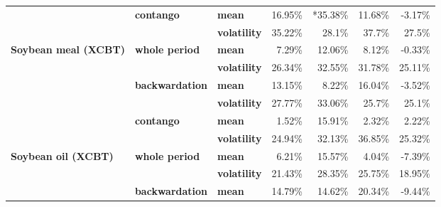 \documentclass[
  authoryear,
  preprint,
  3p]{elsarticle}
\begin{document}
\begin{longtable}[t]{>{}l>{}l>{}l>{}r>{}r>{}r>{}r}
\addlinespace
\textbf{} & \textbf{contango} & \textbf{mean} & \textcolor[HTML]{4285f4}{16.95\%} & \textcolor[HTML]{4285f4}{*35.38\%} & \textcolor[HTML]{4285f4}{11.68\%} & \textcolor[HTML]{4285f4}{-3.17\%}\\
\textbf{} & \textbf{} & \textbf{volatility} & \textcolor[HTML]{4285f4}{35.22\%} & \textcolor[HTML]{4285f4}{28.1\%} & \textcolor[HTML]{4285f4}{37.7\%} & \textcolor[HTML]{4285f4}{27.5\%}\\
\textbf{Soybean meal (XCBT)} & \textbf{whole period} & \textbf{mean} & \textcolor[HTML]{4285f4}{7.29\%} & \textcolor[HTML]{4285f4}{12.06\%} & \textcolor[HTML]{4285f4}{8.12\%} & \textcolor[HTML]{4285f4}{-0.33\%}\\
\textbf{} & \textbf{} & \textbf{volatility} & \textcolor[HTML]{4285f4}{26.34\%} & \textcolor[HTML]{4285f4}{32.55\%} & \textcolor[HTML]{4285f4}{31.78\%} & \textcolor[HTML]{4285f4}{25.11\%}\\
\textbf{} & \textbf{backwardation} & \textbf{mean} & \textcolor[HTML]{4285f4}{13.15\%} & \textcolor[HTML]{4285f4}{8.22\%} & \textcolor[HTML]{4285f4}{16.04\%} & \textcolor[HTML]{4285f4}{-3.52\%}\\
\addlinespace
\textbf{} & \textbf{} & \textbf{volatility} & \textcolor[HTML]{4285f4}{27.77\%} & \textcolor[HTML]{4285f4}{33.06\%} & \textcolor[HTML]{4285f4}{25.7\%} & \textcolor[HTML]{4285f4}{25.1\%}\\
\textbf{} & \textbf{contango} & \textbf{mean} & \textcolor[HTML]{4285f4}{1.52\%} & \textcolor[HTML]{4285f4}{15.91\%} & \textcolor[HTML]{4285f4}{2.32\%} & \textcolor[HTML]{4285f4}{2.22\%}\\
\textbf{} & \textbf{} & \textbf{volatility} & \textcolor[HTML]{4285f4}{24.94\%} & \textcolor[HTML]{4285f4}{32.13\%} & \textcolor[HTML]{4285f4}{36.85\%} & \textcolor[HTML]{4285f4}{25.32\%}\\
\textbf{Soybean oil (XCBT)} & \textbf{whole period} & \textbf{mean} & \textcolor[HTML]{4285f4}{6.21\%} & \textcolor[HTML]{4285f4}{15.57\%} & \textcolor[HTML]{4285f4}{4.04\%} & \textcolor[HTML]{4285f4}{-7.39\%}\\
\textbf{} & \textbf{} & \textbf{volatility} & \textcolor[HTML]{4285f4}{21.43\%} & \textcolor[HTML]{4285f4}{28.35\%} & \textcolor[HTML]{4285f4}{25.75\%} & \textcolor[HTML]{4285f4}{18.95\%}\\
\addlinespace
\textbf{} & \textbf{backwardation} & \textbf{mean} & \textcolor[HTML]{4285f4}{14.79\%} & \textcolor[HTML]{4285f4}{14.62\%} & \textcolor[HTML]{4285f4}{20.34\%} & \textcolor[HTML]{4285f4}{-9.44\%}\\

\end{longtable}
\end{document}
